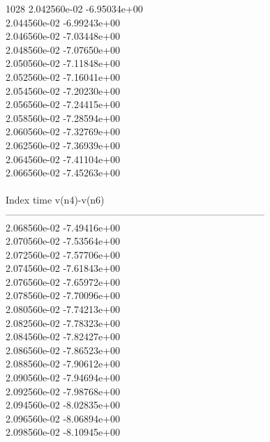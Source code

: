 1028	2.042560e-02	-6.95034e+00	\\ 	2.044560e-02	-6.99243e+00	\\ 	2.046560e-02	-7.03448e+00	\\ 	2.048560e-02	-7.07650e+00	\\ 	2.050560e-02	-7.11848e+00	\\ 	2.052560e-02	-7.16041e+00	\\ 	2.054560e-02	-7.20230e+00	\\ 	2.056560e-02	-7.24415e+00	\\ 	2.058560e-02	-7.28594e+00	\\ 	2.060560e-02	-7.32769e+00	\\ 	2.062560e-02	-7.36939e+00	\\ 	2.064560e-02	-7.41104e+00	\\ 	2.066560e-02	-7.45263e+00	\\ \hline
\\ \hline
Index   time            v(n4)-v(n6)     \\ \hline
--------------------------------------------------------------------------------\\ 	2.068560e-02	-7.49416e+00	\\ 	2.070560e-02	-7.53564e+00	\\ 	2.072560e-02	-7.57706e+00	\\ 	2.074560e-02	-7.61843e+00	\\ 	2.076560e-02	-7.65972e+00	\\ 	2.078560e-02	-7.70096e+00	\\ 	2.080560e-02	-7.74213e+00	\\ 	2.082560e-02	-7.78323e+00	\\ 	2.084560e-02	-7.82427e+00	\\ 	2.086560e-02	-7.86523e+00	\\ 	2.088560e-02	-7.90612e+00	\\ 	2.090560e-02	-7.94694e+00	\\ 	2.092560e-02	-7.98768e+00	\\ 	2.094560e-02	-8.02835e+00	\\ 	2.096560e-02	-8.06894e+00	\\ 	2.098560e-02	-8.10945e+00	\\ \hline
